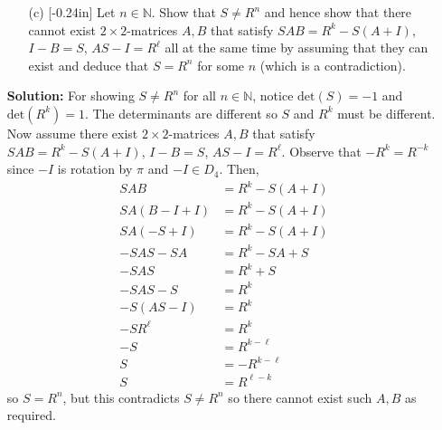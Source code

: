 \documentclass[letterpaper,12pt]{article}
\theoremstyle{definition}
\begin{document}
\begin{enumerate}
    \item[] \begin{enumerate}
        \item[(c)]\reversemarginpar{}[-0.24in] Let $n \in \mathbb{N}$. Show that $S \neq R^n$ and hence show that there cannot exist $2\times 2$-matrices $A,B$ that satisfy $SAB = R^k -S(A+I)$, $I-B = S$, $AS-I=R^\ell$ all at the same time by assuming that they can exist and deduce that $S = R^n$ for some $n$ (which is a contradiction). 
    \end{enumerate}
    \begin{mdframed}
        \textbf{Solution:}
        For showing $S \neq R^n$ for all $n \in \mathbb{N}$, notice $\mathrm{det}(S) = -1$ and $\mathrm{det}(R^k)=1$. The determinants are different so $S$ and $R^k$ must be different. Now assume there exist $2\times 2$-matrices $A,B$ that satisfy $SAB = R^k -S(A+I)$, $I-B = S$, $AS-I=R^\ell$. Observe that $-R^k = R^{-k}$ since $-I$ is rotation by $\pi$ and $-I \in D_4$. Then,
        \begin{align*}
            SAB &= R^k -S(A+I) \\
            SA(B-I+I) &= R^k -S(A+I) \\
            SA(-S+I) &= R^k -S(A+I) \\
            -SAS -SA &= R^k -SA+S \\
            -SAS &= R^k + S \\
            -SAS-S &= R^k \\
            -S(AS-I) &= R^k \\
            -SR^{\ell} &= R^k \\
            -S &= R^{k-\ell} \\
            S &= -R^{k-\ell} \\
            S &= R^{\ell-k}
        \end{align*}
        so $S=R^n$, but this contradicts $S \neq R^n$ so there cannot exist such $A,B$ as required.
    \end{mdframed}
\end{enumerate}
\end{document}
